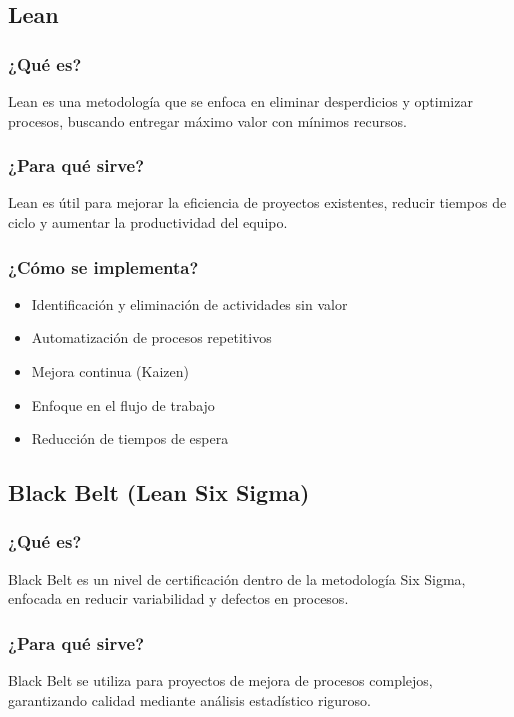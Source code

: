 \documentclass[12pt, a4paper]{article}
\begin{document}
\subsection{Lean}

\subsubsection{¿Qué es?}
Lean es una metodología que se enfoca en eliminar desperdicios y optimizar procesos, buscando entregar máximo valor con mínimos recursos.

\subsubsection{¿Para qué sirve?}
Lean es útil para mejorar la eficiencia de proyectos existentes, reducir tiempos de ciclo y aumentar la productividad del equipo.

\subsubsection{¿Cómo se implementa?}
\begin{itemize}
    \item Identificación y eliminación de actividades sin valor
    \item Automatización de procesos repetitivos
    \item Mejora continua (Kaizen)
    \item Enfoque en el flujo de trabajo
    \item Reducción de tiempos de espera
\end{itemize}

\subsection{Black Belt (Lean Six Sigma)}

\subsubsection{¿Qué es?}
Black Belt es un nivel de certificación dentro de la metodología Six Sigma, enfocada en reducir variabilidad y defectos en procesos.

\subsubsection{¿Para qué sirve?}
Black Belt se utiliza para proyectos de mejora de procesos complejos, garantizando calidad mediante análisis estadístico riguroso.
\end{document}
